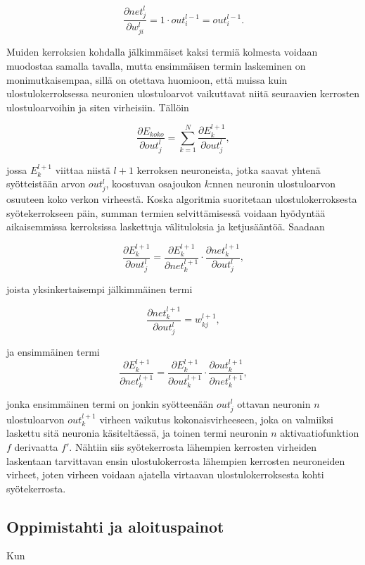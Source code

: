 \documentclass[finnish]{tktltiki2}
\theoremstyle{definition}
\theoremstyle{remark}
\begin{document}
    $$ \frac{\partial net_j^{l}}{\partial w_{ji}^l} = 1 \cdot out_i^{l-1} = out_i^{l-1}. $$
    
    Muiden kerroksien kohdalla jälkimmäiset kaksi termiä kolmesta voidaan muodostaa samalla tavalla, mutta ensimmäisen termin laskeminen on monimutkaisempaa, sillä on otettava huomioon, että muissa kuin ulostulokerroksessa neuronien ulostuloarvot vaikuttavat niitä seuraavien kerrosten ulostuloarvoihin ja siten virheisiin. Tällöin 

    $$ \frac{\partial E_{koko}}{\partial out_j^l} = \sum_{k=1}^{N} \frac{\partial E_{k}^{l+1}}{\partial out_j^l},$$

    jossa $ E_{k}^{l+1} $ viittaa niistä $l+1$ kerroksen neuroneista, jotka saavat yhtenä syötteistään arvon $out_j^l$, koostuvan osajoukon $k$:nnen neuronin ulostuloarvon osuuteen koko verkon virheestä. Koska algoritmia suoritetaan ulostulokerroksesta syötekerrokseen päin, summan termien selvittämisessä voidaan hyödyntää aikaisemmissa kerroksissa laskettuja välituloksia ja ketjusääntöä. Saadaan

    $$ \frac{\partial E_{k}^{l+1}}{\partial out_j^l} = \frac{\partial E_{k}^{l+1}}{\partial net_k^{l+1}} \cdot \frac{\partial net_k^{l+1}}{\partial out_j^l}, $$

    \noindent joista yksinkertaisempi jälkimmäinen termi
    
    $$ \frac{\partial net_k^{l+1}}{\partial out_j^l} = w_{kj}^{l+1}, $$

    \noindent ja ensimmäinen termi
    $$ \frac{\partial E_{k}^{l+1}}{\partial net_k^{l+1}} = \frac{\partial E_{k}^{l+1}}{\partial out_k^{l+1}} \cdot \frac{\partial out_k^{l+1}}{\partial net_k^{l+1}}, $$

    \noindent jonka ensimmäinen termi on jonkin syötteenään $out_j^l$ ottavan neuronin $n$ ulostuloarvon $out_k^{l+1}$ virheen vaikutus kokonaisvirheeseen, joka on valmiiksi laskettu sitä neuronia käsiteltäessä, ja toinen termi neuronin $n$ aktivaatiofunktion $f$ derivaatta $f'$. Nähtiin siis syötekerrosta lähempien kerrosten virheiden laskentaan tarvittavan ensin ulostulokerrosta lähempien kerrosten neuroneiden virheet, joten virheen voidaan ajatella virtaavan ulostulokerroksesta kohti syötekerrosta.
  \subsection{Oppimistahti ja aloituspainot}
  Kun 
\end{document}
